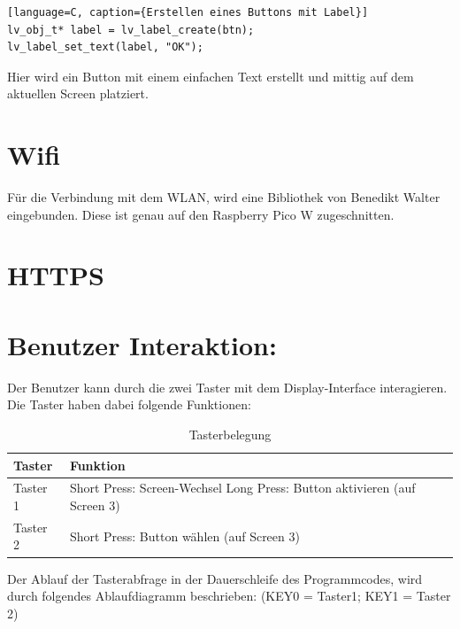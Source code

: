 \begin{inhalt}
\begin{lstlisting}[style=mytsx][language=C, caption={Erstellen eines Buttons mit Label}]
lv_obj_t* label = lv_label_create(btn);
lv_label_set_text(label, "OK");
\end{lstlisting}

Hier wird ein Button mit einem einfachen Text erstellt und mittig auf dem aktuellen Screen platziert.

\section{Wifi}

Für die Verbindung mit dem WLAN, wird eine Bibliothek von Benedikt Walter eingebunden. Diese ist genau auf den Raspberry Pico W zugeschnitten. 

\section{HTTPS}

\section{Benutzer Interaktion:}

Der Benutzer kann durch die zwei Taster mit dem Display-Interface interagieren. Die Taster haben dabei folgende Funktionen:

\begin{table}[H]
\centering
\renewcommand{\arraystretch}{1.3}
\begin{tabular}{|l|p{10cm}|}
\hline
\rowcolor{cyan!20}
\textbf{Taster} & \textbf{Funktion} \\
\hline
Taster 1 & 
Short Press: Screen-Wechsel \newline
Long Press: Button aktivieren (auf Screen 3) \\
\hline
Taster 2 & 
Short Press: Button wählen (auf Screen 3) \\
\hline
\end{tabular}
\caption{Tasterbelegung}
\label{tab:Taster-Funktionen}
\end{table}


Der Ablauf der Tasterabfrage in der Dauerschleife des Programmcodes, wird durch folgendes Ablaufdiagramm beschrieben: (KEY0 = Taster1; KEY1 = Taster 2)


\end{inhalt}
